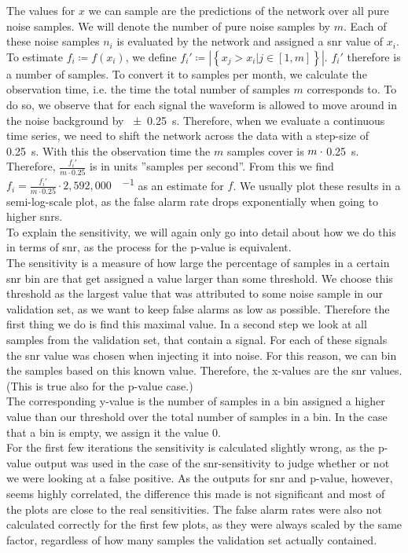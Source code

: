 The values for $x$ we can sample are the predictions of the network over all pure noise samples. We will denote the number of pure noise samples by $m$. Each of these noise samples $n_i$ is evaluated by the network and assigned a \gls{snr} value of $x_i$. To estimate $f_i\coloneqq f(x_i)$, we define $f_i'\coloneqq \left|\left\{ x_j > x_i | j\in \left[1, m\right]\right\}\right|$. $f_i'$ therefore is a number of samples. To convert it to samples per month, we calculate the observation time, i.e. the time the total number of samples $m$ corresponds to. To do so, we observe that for each signal the waveform is allowed to move around in the noise background by \SI{\pm 0.25}{\s}. Therefore, when we evaluate a continuous time series, we need to shift the network across the data with a step-size of \SI{0.25}{\s}. With this the observation time the $m$ samples cover is $m\cdot\vphantom{0.25}$\SI{0.25}{\s}. Therefore, $\frac{f_i'}{m\cdot 0.25}$ is in units ''samples per second''. From this we find $f_i=\frac{f_i'}{m\cdot 0.25}\cdot2,592,000$\SI[per-mode=fraction]{}{\samples\per\month} as an estimate for $f$. We usually plot these results in a semi-log-scale plot, as the false alarm rate drops exponentially when going to higher \gls{snr}s.\\
To explain the sensitivity, we will again only go into detail about how we do this in terms of \gls{snr}, as the process for the p-value is equivalent.\\
The sensitivity is a measure of how large the percentage of samples in a certain \gls{snr} bin are that get assigned a value larger than some threshold. We choose this threshold as the largest value that was attributed to some noise sample in our validation set, as we want to keep false alarms as low as possible. Therefore the first thing we do is find this maximal value. In a second step we look at all samples from the validation set, that contain a signal. For each of these signals the \gls{snr} value was chosen when injecting it into noise. For this reason, we can bin the samples based on this known value. Therefore, the x-values are the \gls{snr} values. (This is true also for the p-value case.)\\
The corresponding y-value is the number of samples in a bin assigned a higher value than our threshold over the total number of samples in a bin. In the case that a bin is empty, we assign it the value 0.\\
For the first few iterations the sensitivity is calculated slightly wrong, as the p-value output was used in the case of the \gls{snr}-sensitivity to judge whether or not we were looking at a false positive. As the outputs for \gls{snr} and p-value, however, seems highly correlated, the difference this made is not significant and most of the plots are close to the real sensitivities. The false alarm rates were also not calculated correctly for the first few plots, as they were always scaled by the same factor, regardless of how many samples the validation set actually contained.\medskip\\
